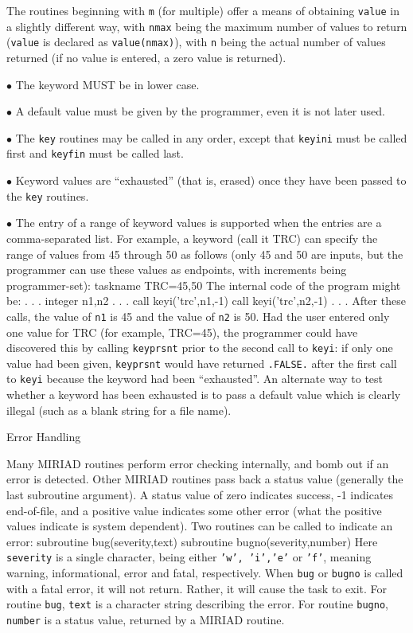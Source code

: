 The routines beginning with {\tt m} (for multiple) offer a means of
obtaining {\tt value} in a slightly different way, with {\tt nmax} being
the maximum number of values to return ({\tt value} is declared as
{\tt value(nmax)}), with {\tt n} being the actual number of values returned
(if no value is entered, a zero value is returned).


\item{$\bullet$} The keyword MUST be in lower case.
\item{$\bullet$} A default value must be given by the programmer, even
it is not later used.
\item{$\bullet$} The {\tt key} routines may be called in any order, except
that {\tt keyini} must be called first and {\tt keyfin} must be called
last.
\item{$\bullet$} Keyword values are ``exhausted'' (that is, erased) once
they have been passed to the {\tt key} routines.
\item{$\bullet$} The entry of a range of keyword values is supported
when the entries are a comma-separated list.  For example, a keyword
(call it TRC) can specify the range of values from 45 through 50 as
follows (only 45 and 50 are inputs, but the programmer can use these values
as endpoints, with increments being programmer-set):
{\ninepoint\begintt
taskname TRC=45,50
\endtt}
The internal code of the program might be:
{\ninepoint\begintt
.
.
.
integer n1,n2
.
.
.
call keyi('trc',n1,-1)
call keyi('trc',n2,-1)
.
.
.
\endtt}
After these calls, the value of {\tt n1} is 45 and the value of {\tt n2}
is 50.  Had the user entered only one value for TRC (for example, TRC=45),
the programmer could have discovered this by calling {\tt keyprsnt} prior
to the second call to {\tt keyi}:  if only one value had been given, 
{\tt keyprsnt} would have returned {\tt .FALSE.} after the first call to
{\tt keyi} because the keyword had been ``exhausted''.  An alternate way to
test whether a keyword has been exhausted is to pass a default value which
is clearly illegal (such as a blank string for a file name).

\beginsection Error Handling

Many MIRIAD routines perform error checking internally, and bomb out
if an error is detected. Other MIRIAD routines pass back a status
value (generally the last subroutine argument). A status value of zero
indicates success, -1 indicates end-of-file, and a positive value indicates
some other error (what the positive values indicate is system dependent).
Two routines can be called to indicate an error:
{\ninepoint\begintt
subroutine bug(severity,text)
subroutine bugno(severity,number)
\endtt}
Here {\tt severity} is a single character, being either {\tt 'w', 'i','e'}
or {\tt 'f'}, meaning warning, informational, error and fatal, respectively.
When {\tt bug} or {\tt bugno} is called with a fatal error, it will not
return. Rather, it will cause the task to exit. For routine {\tt bug},
{\tt text} is a character string describing the error. For routine
{\tt bugno}, {\tt number} is a status value, returned by a MIRIAD
 routine.

